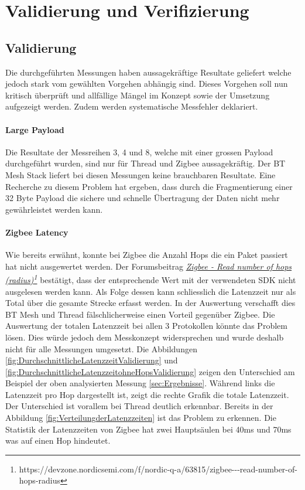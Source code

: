 \clearpage
\section{Validierung und Verifizierung}\label{sec:ValidierungVerifizierung}

\subsection{Validierung}\label{subsec:Validierung}
Die durchgeführten Messungen haben aussagekräftige Resultate geliefert welche jedoch stark vom gewählten Vorgehen abhängig sind. Dieses Vorgehen soll nun kritisch überprüft und allfällige Mängel im Konzept sowie der Umsetzung aufgezeigt werden. Zudem werden systematische Messfehler deklariert.

\paragraph{Large Payload}
Die Resultate der Messreihen 3, 4 und 8, welche mit einer grossen Payload durchgeführt wurden, sind nur für Thread und Zigbee aussagekräftig. Der BT Mesh Stack liefert bei diesen Messungen keine brauchbaren Resultate. Eine Recherche zu diesem Problem hat ergeben, dass durch die Fragmentierung einer 32 Byte Payload die sichere und schnelle Übertragung der Daten nicht mehr gewährleistet werden kann.

\paragraph{Zigbee Latency}
Wie bereits erwähnt, konnte bei Zigbee die Anzahl Hops die ein Paket passiert hat nicht ausgewertet werden.
Der Forumsbeitrag \href{https://devzone.nordicsemi.com/f/nordic-q-a/63815/zigbee---read-number-of-hops-radius}{\textit{Zigbee - Read number of hops (radius)\footnote{\url{https://devzone.nordicsemi.com/f/nordic-q-a/63815/zigbee---read-number-of-hops-radius}}}} bestätigt, dass der entsprechende Wert mit der verwendeten SDK nicht ausgelesen werden kann.
Als Folge dessen kann schliesslich die Latenzzeit nur als Total über die gesamte Strecke erfasst werden. In der Auswertung verschafft dies BT Mesh und Thread fälschlicherweise einen Vorteil gegenüber Zigbee.
Die Auswertung der totalen Latenzzeit bei allen 3 Protokollen könnte das Problem lösen.
Dies würde jedoch dem Messkonzept widersprechen und wurde deshalb nicht für alle Messungen umgesetzt.
Die Abbildungen \ref{fig:DurchschnittlicheLatenzzeitValidierung} und \ref{fig:DurchschnittlicheLatenzzeitohneHopsValidierung} zeigen den Unterschied am Beispiel der oben analysierten Messung \ref{sec:Ergebnisse}.
Während links die Latenzzeit pro Hop dargestellt ist, zeigt die rechte Grafik die totale Latenzzeit.
Der Unterschied ist vorallem bei Thread deutlich erkennbar.
Bereits in der Abbildung \ref{fig:VerteilungderLatenzzeiten} ist das Problem zu erkennen.
Die Statistik der Latenzzeiten von Zigbee hat zwei Hauptsäulen bei 40ms und 70ms was auf einen Hop hindeutet.


